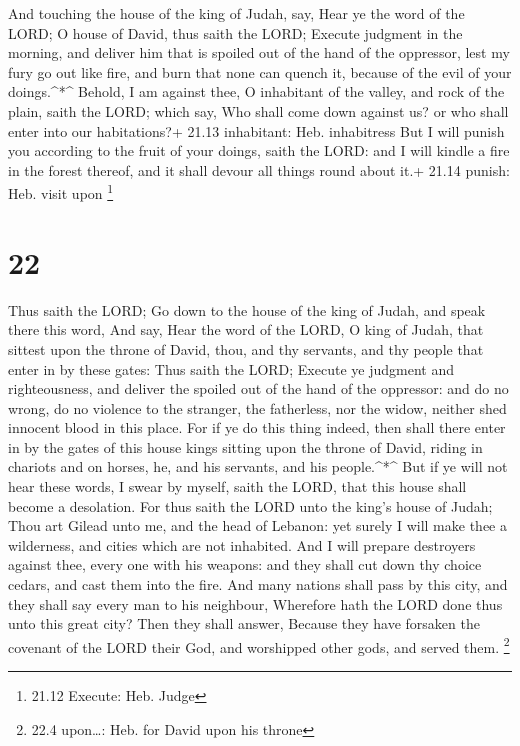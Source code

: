  And touching the house of the king of Judah, say, Hear ye
the word of the LORD;  O house of David, thus saith the
LORD; Execute judgment in the morning, and deliver him that is spoiled
out of the hand of the oppressor, lest my fury go out like fire, and
burn that none can quench it, because of the evil of your
doings.\^{}*\^{}  Behold, I am against thee, O inhabitant
of the valley, and rock of the plain, saith the LORD; which say, Who
shall come down against us? or who shall enter into our habitations?+
21.13 inhabitant: Heb. inhabitress  But I will punish you
according to the fruit of your doings, saith the LORD: and I will kindle
a fire in the forest thereof, and it shall devour all things round about
it.+ 21.14 punish: Heb. visit upon \footnote{21.12 Execute: Heb. Judge}

\hypertarget{section-21}{%
\section{22}\label{section-21}}

 Thus saith the LORD; Go down to the house of the king of
Judah, and speak there this word,  And say, Hear the word of
the LORD, O king of Judah, that sittest upon the throne of David, thou,
and thy servants, and thy people that enter in by these gates:
 Thus saith the LORD; Execute ye judgment and righteousness,
and deliver the spoiled out of the hand of the oppressor: and do no
wrong, do no violence to the stranger, the fatherless, nor the widow,
neither shed innocent blood in this place.  For if ye do
this thing indeed, then shall there enter in by the gates of this house
kings sitting upon the throne of David, riding in chariots and on
horses, he, and his servants, and his people.\^{}*\^{}  But
if ye will not hear these words, I swear by myself, saith the LORD, that
this house shall become a desolation.  For thus saith the
LORD unto the king's house of Judah; Thou art Gilead unto me, and the
head of Lebanon: yet surely I will make thee a wilderness, and cities
which are not inhabited.  And I will prepare destroyers
against thee, every one with his weapons: and they shall cut down thy
choice cedars, and cast them into the fire.  And many
nations shall pass by this city, and they shall say every man to his
neighbour, Wherefore hath the LORD done thus unto this great city?
 Then they shall answer, Because they have forsaken the
covenant of the LORD their God, and worshipped other gods, and served
them. \footnote{22.4 upon\ldots: Heb. for David upon his throne}

